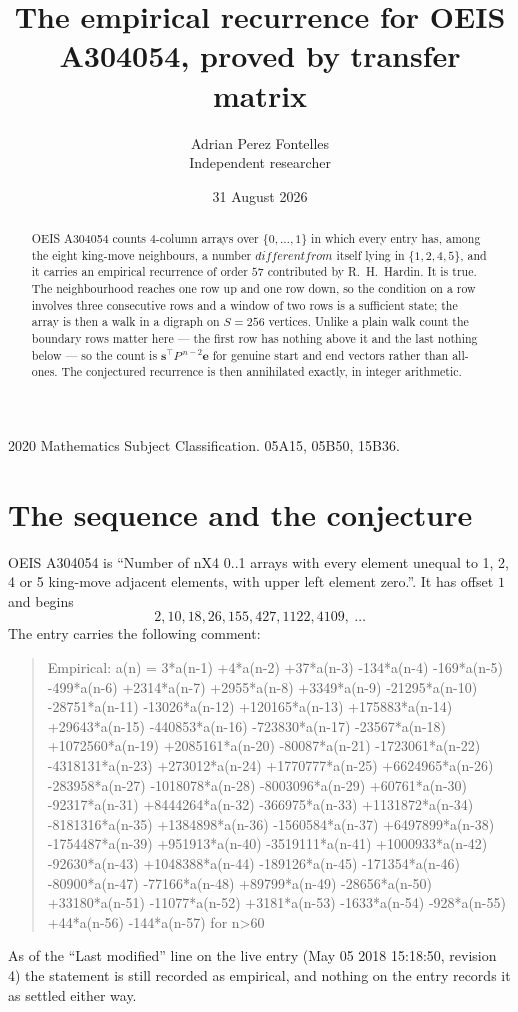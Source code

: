 \documentclass[11pt,a4paper]{article}
\title{The empirical recurrence for OEIS A304054, proved by transfer matrix}
\author{Adrian Perez Fontelles\\ \small Independent researcher}
\date{31 August 2026}
\theoremstyle{plain}
\theoremstyle{definition}
\begin{document}
\maketitle

\begin{abstract}
OEIS A304054 counts $4$-column arrays over $\{0,\dots,1\}$ in which every entry has,
among the eight king-move neighbours, a number $different from$ itself lying in $\{1,2,4,5\}$, and it carries an empirical
recurrence of order $57$ contributed by R.~H.~Hardin. It is true. The neighbourhood
reaches one row up and one row down, so the condition on a row involves three consecutive
rows and a window of two rows is a sufficient state; the array is then a walk in a digraph
on $S=256$ vertices. Unlike a plain walk count the boundary rows matter here --- the first
row has nothing above it and the last nothing below --- so the count is
$\mathbf{s}^{\!\top}P^{\,n-2}\mathbf{e}$ for genuine start and end vectors rather than
all-ones. The conjectured recurrence is then annihilated exactly, in integer arithmetic.
\end{abstract}

\noindent\small 2020 Mathematics Subject Classification. 05A15, 05B50, 15B36.\normalsize

\section{The sequence and the conjecture}

OEIS A304054 is ``Number of nX4 0..1 arrays with every element unequal to 1, 2, 4 or 5 king-move adjacent elements, with upper left element zero.''. It has offset
$1$ and begins
\[
2, 10, 18, 26, 155, 427, 1122, 4109,\ \dots
\]
The entry carries the following comment:
\begin{quote}\small
Empirical: a(n) = 3*a(n-1) +4*a(n-2) +37*a(n-3) -134*a(n-4) -169*a(n-5) -499*a(n-6) +2314*a(n-7) +2955*a(n-8) +3349*a(n-9) -21295*a(n-10) -28751*a(n-11) -13026*a(n-12) +120165*a(n-13) +175883*a(n-14) +29643*a(n-15) -440853*a(n-16) -723830*a(n-17) -23567*a(n-18) +1072560*a(n-19) +2085161*a(n-20) -80087*a(n-21) -1723061*a(n-22) -4318131*a(n-23) +273012*a(n-24) +1770777*a(n-25) +6624965*a(n-26) -283958*a(n-27) -1018078*a(n-28) -8003096*a(n-29) +60761*a(n-30) -92317*a(n-31) +8444264*a(n-32) -366975*a(n-33) +1131872*a(n-34) -8181316*a(n-35) +1384898*a(n-36) -1560584*a(n-37) +6497899*a(n-38) -1754487*a(n-39) +951913*a(n-40) -3519111*a(n-41) +1000933*a(n-42) -92630*a(n-43) +1048388*a(n-44) -189126*a(n-45) -171354*a(n-46) -80900*a(n-47) -77166*a(n-48) +89799*a(n-49) -28656*a(n-50) +33180*a(n-51) -11077*a(n-52) +3181*a(n-53) -1633*a(n-54) -928*a(n-55) +44*a(n-56) -144*a(n-57) for n>60
\end{quote}
As of the ``Last modified'' line on the live entry (May 05 2018 15:18:50, revision
4) the statement is still recorded as empirical, and nothing on the entry
records it as settled either way.
\end{document}
